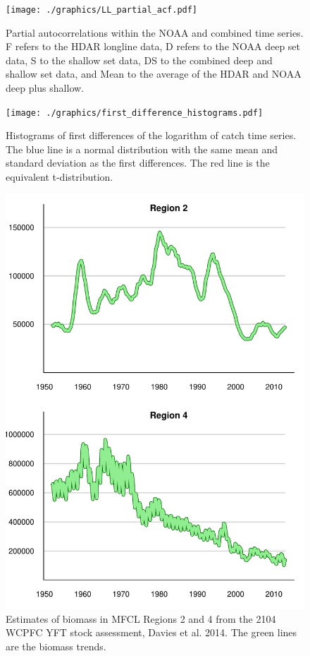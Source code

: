 \documentclass[12pt,letterpaper]{article}
\begin{document}
\begin{figure}
\begin{center}
\texttt{[image: ./graphics/LL\_partial\_acf.pdf]}
\caption{\label{fig:LLpartialacf}
Partial autocorrelations within the NOAA and combined time
series. F refers to the HDAR longline data, D refers to the NOAA deep
set data, S to the shallow set data,
DS to the combined deep and shallow set data, and Mean to the average
of the HDAR and NOAA deep plus shallow.
}
\end{center}
\end{figure}

\begin{figure}
\begin{center}
\texttt{[image: ./graphics/first\_difference\_histograms.pdf]}
\caption{\label{fig:diff1histo}
Histograms of first differences of the logarithm of catch time series. 
The blue line is
a normal distribution with the same mean and standard deviation as the
first differences. The red line is the equivalent t-distribution.}
\end{center}
\end{figure}

\begin{figure}
\begin{center}
\includegraphics[height=0.8\textheight]{./graphics/MFCL_region_biomass.pdf}
\caption{\label{fig:MFCLregionB}
Estimates of biomass in MFCL Regions 2 and 4 from the 2104 WCPFC YFT
stock assessment, Davies et al. 2014. The green lines are the biomass
trends.}
\end{center}
\end{figure}
\end{document}

